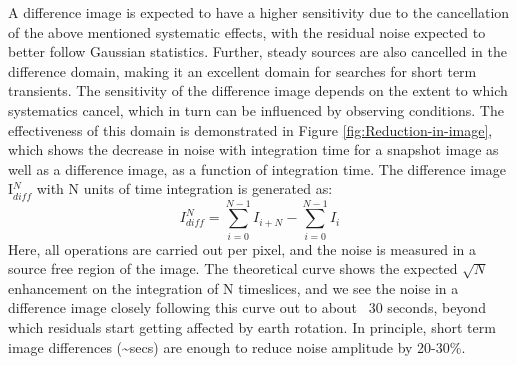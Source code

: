 \documentclass{aa}
\begin{document}
A  difference  image  is expected  to  have  a  higher  sensitivity due  to  the
cancellation of the above mentioned  systematic effects, with the residual noise
expected to better follow Gaussian statistics.  Further, steady sources are also
cancelled in the  difference domain, making it an  excellent domain for searches
for short term  transients.  The sensitivity of the  difference image depends on
the  extent to  which systematics  cancel, which  in turn  can be  influenced by
observing  conditions.  The  effectiveness  of this  domain  is demonstrated  in
Figure  \ref{fig:Reduction-in-image}, which  shows  the decrease  in noise  with
integration  time for  a snapshot  image as  well as  a difference  image,  as a
function of integration time.  The difference image I$^N_{diff}$ with N units of
time integration is generated as:
\begin{equation}
I^N_{diff} = \sum\limits_{i=0}^{N-1} I_{i+N} - \sum\limits_{i=0}^{N-1} I_i \label{eq:diff_img}
\end{equation}
Here, all operations are  carried out per pixel, and the noise  is measured in a
source  free region  of the  image.  The  theoretical curve  shows  the expected
$\sqrt{N}$ enhancement on the integration of  N timeslices, and we see the noise
in a  difference image closely  following this curve  out to about  ~30 seconds,
beyond which residuals start getting  affected by earth rotation.  In principle,
short term image differences  (\textasciitilde{}secs) are enough to reduce noise
amplitude by 20-30\%.
\end{document}

